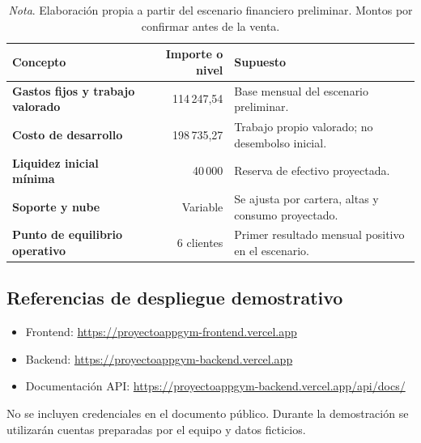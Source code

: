 \begin{table}[htbp]
\caption{Supuestos principales del análisis financiero de Pulso}
\begin{tabularx}{\textwidth}{>{\bfseries}p{4.3cm}r X}
\toprule
Concepto & Importe o nivel & Supuesto \\
\midrule
Gastos fijos y trabajo valorado & 114\,247,54 & Base mensual del escenario preliminar. \\
Costo de desarrollo & 198\,735,27 & Trabajo propio valorado; no desembolso inicial. \\
Liquidez inicial mínima & 40\,000 & Reserva de efectivo proyectada. \\
Soporte y nube & Variable & Se ajusta por cartera, altas y consumo proyectado. \\
\midrule
Punto de equilibrio operativo & 6 clientes & Primer resultado mensual positivo en el escenario. \\
\bottomrule
\end{tabularx}
\caption*{\textit{Nota}. Elaboración propia a partir del escenario financiero preliminar. Montos por confirmar antes de la venta.}
\end{table}

\subsection{Referencias de despliegue demostrativo}

\begin{itemize}
  \item Frontend: \url{https://proyectoappgym-frontend.vercel.app}
  \item Backend: \url{https://proyectoappgym-backend.vercel.app}
  \item Documentación API: \url{https://proyectoappgym-backend.vercel.app/api/docs/}
\end{itemize}

No se incluyen credenciales en el documento público. Durante la demostración se
utilizarán cuentas preparadas por el equipo y datos ficticios.
